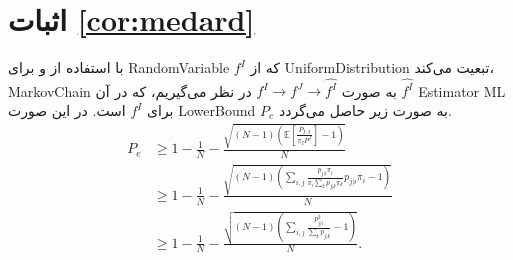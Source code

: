 \section{اثبات \autoref{cor:medard}}
\label{proof:medard}
با استفاده از 
\cite[نتیجه 2]{Christiansen2013Bounds} و 
برای 
\gls{RandomVariable} $f^I$
که از 
\gls{UniformDistribution}
تبعیت می‌کند، 
\gls{MarkovChain}
به صورت
$ f^I\longrightarrow f^J \longrightarrow \hat{f^I} $
در نظر می‌گیریم، که در آن
$ \hat{f^I} $ \gls{Estimator} \gls{ML} برای $f^I$
است. در این صورت 
\gls{LowerBound} $P_e$
به صورت زیر حاصل می‌گردد.
\begin{align}
P_e &\ge 1-\frac{1}{N} - \frac{\sqrt{(N-1)(\mathbb{E}[\frac{P_{I,J}}{\pi_I P^J}]-1)}}{N}\nonumber\\
& \ge 1-\frac{1}{N} - \frac{\sqrt{(N-1)(\sum_{i,j} \frac{p_{j|i}\pi_i}{\pi_i \sum_{k}p_{j|k}\pi_k} p_{j|i}\pi_i -1)}}{N}\nonumber\\
&
\ge 1-\frac{1}{N} - \frac{\sqrt{(N-1)(\sum_{i,j}\frac{p_{j|i}^2}{ \sum_{k}p_{j|k}}-1)}}{N}.
\end{align}







